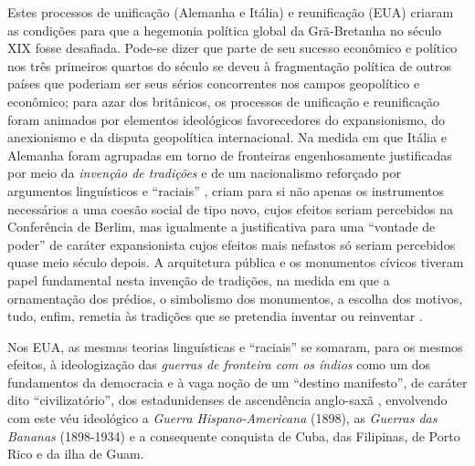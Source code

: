 Estes processos de unificação (Alemanha e Itália) e reunificação (EUA) criaram as condições para que a hegemonia política global da Grã-Bretanha no século XIX fosse desafiada. Pode-se dizer que parte de seu sucesso econômico e político nos três primeiros quartos do século se deveu à fragmentação política de outros países que poderiam ser seus sérios concorrentes nos campos geopolítico e econômico; para azar dos britânicos, os processos de unificação e reunificação foram animados por elementos ideológicos favorecedores do expansionismo, do anexionismo e da disputa geopolítica internacional. Na medida em que Itália e Alemanha foram agrupadas em torno de fronteiras engenhosamente justificadas por meio da \textit{invenção de tradições} \cite{hobsbawm_prodtrad_2012} e de um nacionalismo reforçado por argumentos linguísticos e ``raciais'' \cite{hobsbawm_transfnac_2011}, criam para si não apenas os instrumentos necessários a uma coesão social de tipo novo, cujos efeitos seriam percebidos na Conferência de Berlim, mas igualmente a justificativa para uma ``vontade de poder'' de caráter expansionista \cite{rocker_nacult_1954} cujos efeitos mais nefastos só seriam percebidos quase meio século depois. A arquitetura pública e os monumentos cívicos tiveram papel fundamental nesta invenção de tradições, na medida em que a ornamentação dos prédios, o simbolismo dos monumentos, a escolha dos motivos, tudo, enfim, remetia às tradições que se pretendia inventar ou reinventar \cite{hobsbawm_prodtrad_2012}.

Nos EUA, as mesmas teorias linguísticas e ``raciais'' se somaram, para os mesmos efeitos, à ideologização das \textit{guerras de fronteira com os índios} como um dos fundamentos da democracia \cite{turner_frontier_1920} e à vaga noção de um ``destino manifesto'', de caráter dito ``civilizatório'', dos estadunidenses de ascendência anglo-saxã \cite{brown_mandest__1980,horsman_mandest_1981}, envolvendo com este véu ideológico a \textit{Guerra Hispano-Americana} (1898), as \textit{Guerras das Bananas} (1898-1934) e a consequente conquista de Cuba, das Filipinas, de Porto Rico e da ilha de Guam.

